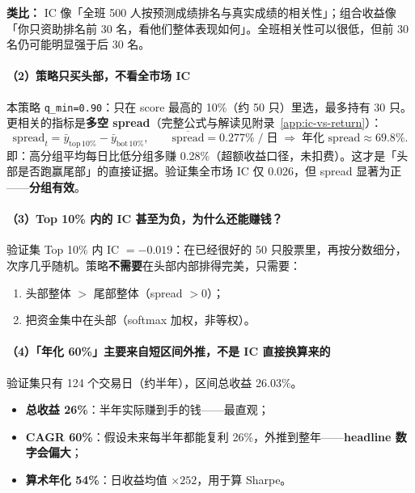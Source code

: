\documentclass[UTF8,a4paper,12pt]{ctexart}
\begin{document}
\textbf{类比：} IC 像「全班 500 人按预测成绩排名与真实成绩的相关性」；组合收益像「你只资助排名前 30 名，看他们整体表现如何」。全班相关性可以很低，但前 30 名仍可能明显强于后 30 名。

\paragraph{（2）策略只买头部，不看全市场 IC}

本策略 \texttt{q\_min=0.90}：只在 score 最高的 10\%（约 50 只）里选，最多持有 30 只。更相关的指标是\textbf{多空 spread}（完整公式与解读见附录~\ref{app:ic-vs-return}）：
\begin{equation}
  \mathrm{spread}_t
  = \bar{y}_{\mathrm{top\,10\%}} - \bar{y}_{\mathrm{bot\,10\%}},
  \qquad
  \overline{\mathrm{spread}} = 0.277\%\;/\;\text{日}
  \;\Rightarrow\;
  \text{年化 spread} \approx 69.8\%.
\end{equation}
即：高分组平均每日比低分组多赚 0.28\%（超额收益口径，未扣费）。这才是「头部是否跑赢尾部」的直接证据。验证集全市场 IC 仅 0.026，但 spread 显著为正——\textbf{分组有效}。

\paragraph{（3）Top 10\% 内的 IC 甚至为负，为什么还能赚钱？}

验证集 Top 10\% 内 IC $=-0.019$：在已经很好的 50 只股票里，再按分数细分，次序几乎随机。策略\textbf{不需要}在头部内部排得完美，只需要：
\begin{enumerate}[leftmargin=2em]
  \item 头部整体 $>$ 尾部整体（spread $>0$）；
  \item 把资金集中在头部（softmax 加权，非等权）。
\end{enumerate}

\paragraph{（4）「年化 60\%」主要来自短区间外推，不是 IC 直接换算来的}

验证集只有 124 个交易日（约半年），区间总收益 26.03\%。
\begin{itemize}[leftmargin=2em]
  \item \textbf{总收益 26\%}：半年实际赚到手的钱——最直观；
  \item \textbf{CAGR 60\%}：假设未来每半年都能复利 26\%，外推到整年——\textbf{headline 数字会偏大}；
  \item \textbf{算术年化 54\%}：日收益均值 $\times 252$，用于算 Sharpe。
\end{itemize}
\end{document}
